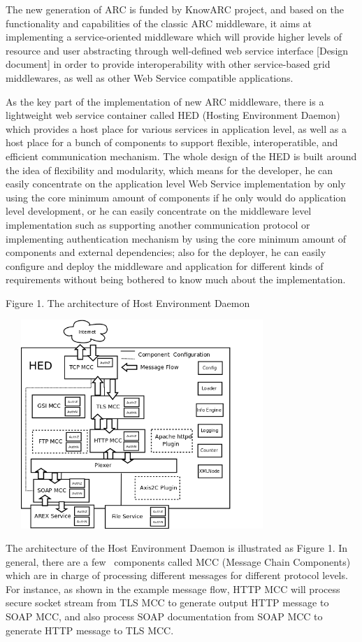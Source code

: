 \documentclass{article}
\begin{document}
The new generation of ARC is funded by KnowARC project, and based on the
functionality and capabilities of the classic ARC middleware, it aims
at implementing a service-oriented middleware which will provide higher
levels of resource and user abstracting through well-defined web
service interface [Design document] in order to provide
interoperability with other service-based grid middlewares, as well as
other Web Service compatible applications.

As the key part of the implementation of new ARC middleware, there is a
lightweight web service container called HED (Hosting Environment
Daemon) which provides a host place for various services in application
level, as well as a host place for a bunch of components to support
flexible, interoperatible, and efficient communication mechanism. The
whole design of the HED is built around the idea of flexibility and
modularity, which means for the developer, he can easily concentrate on
the application level Web Service implementation by only using the core
minimum amount of components if he only would do application level
development, or he can easily concentrate on the middleware level
implementation such as supporting another communication protocol or
implementing authentication mechanism by using the core minimum amount
of components and external dependencies; also for the deployer, he can
easily configure and deploy the middleware and application for
different kinds of requirements without being bothered to know much
about the implementation.

{\centering
Figure 1. The architecture of Host Environment Daemon
\par}

\begin{center}
\includegraphics[width=4.0673in,height=3.1047in]{Secpaper-img1.png}
\end{center}
The architecture of the Host Environment Daemon is illustrated as Figure
1. In general, there are a few \ components called MCC (Message Chain
Components) which are in charge of processing different messages for
different protocol levels. For instance, as shown in the example
message flow, HTTP MCC will process secure socket stream from TLS MCC
to generate output HTTP message to SOAP MCC, and also process SOAP
documentation from SOAP MCC to generate HTTP message to TLS MCC. 
\end{document}
